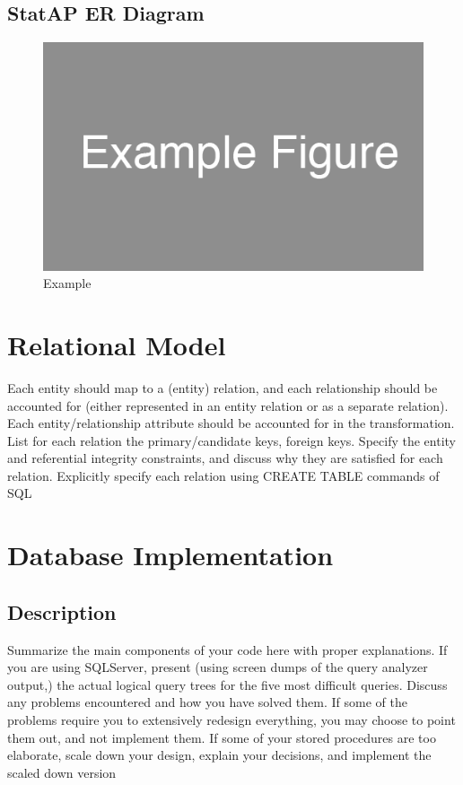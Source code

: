 \documentclass[12pt,letterpaper]{article}
\begin{document}
\subsection{StatAP ER Diagram}
\begin{figure}
\centering
\includegraphics[scale=0.35]{images/example_figure.png}
\caption{Example}
\label{fig:home}
\end{figure}

\clearpage\null

\section{Relational Model}
Each entity should map to a (entity) relation, and each relationship should be accounted for (either represented in an entity relation or as a separate relation). Each entity/relationship attribute should be accounted for in the transformation. List for
each relation the primary/candidate keys, foreign keys. Specify the entity and referential integrity constraints, and discuss why they are satisfied for each relation. Explicitly specify each relation using CREATE TABLE commands of SQL

\clearpage\null

\section{Database Implementation}

\subsection{Description}
Summarize the main components of your code here with proper explanations.
If you are using SQLServer, present (using screen dumps of the query analyzer output,) the actual
logical query trees for the five most difficult queries. Discuss any problems encountered and how
you have solved them. If some of the problems require you to extensively redesign everything, you
may choose to point them out, and not implement them. If some of your stored procedures are too
elaborate, scale down your design, explain your decisions, and implement the scaled down version
\end{document}
